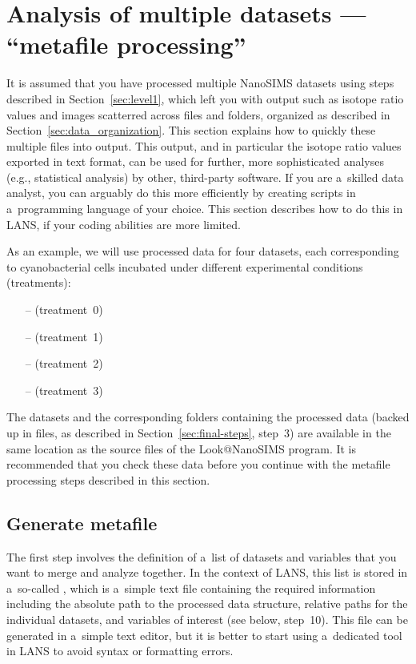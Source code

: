 \section{Analysis of multiple datasets --- ``metafile processing''}
\label{sec:level2}

It is assumed that you have processed multiple NanoSIMS datasets using steps described in Section~\ref{sec:level1}, which left you with output such as isotope ratio values and images scatterred across  files and folders, organized as described in Section~\ref{sec:data_organization}. This section explains how to quickly  these multiple files into  output. This output, and in particular the isotope ratio values exported in text format, can be used for further, more sophisticated analyses (e.g., statistical analysis) by other, third-party software. If you are a~skilled data analyst, you can arguably do this more efficiently by creating scripts in a~programming language of your choice. This section describes how to do this in LANS, if your coding abilities are more limited.

As an example, we will use processed data for four datasets, each corresponding to cyanobacterial cells incubated under different experimental conditions (treatments): 
\begin{itemize}
\item[--] (treatment~0)
\item[--] (treatment~1)
\item[--] (treatment~2)
\item[--] (treatment~3)
\end{itemize}
The datasets and the corresponding folders containing the processed data (backed up in  files, as described in Section~\ref{sec:final-steps}, step~3) are available in the same location as the source files of the Look@NanoSIMS program. It is recommended that you check these data before you continue with the metafile processing steps described in this section.


\subsection{Generate metafile}
\setcounter{step}{0}

The first step involves the definition of a~list of datasets and variables that you want to merge and analyze together. In the context of LANS, this list is stored in a~so-called , which is a~simple text file containing the required information including the absolute path to the processed data structure, relative paths for the individual datasets, and variables of interest (see below, step~10). This file can be generated in a~simple text editor, but it is better to start using a~dedicated tool in LANS to avoid syntax or formatting errors.


